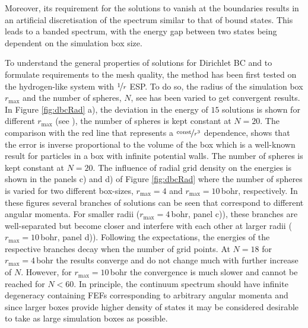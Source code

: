 Moreover, its requirement for the solutions to vanish at the boundaries results in an artificial discretisation of the spectrum similar to that of bound states.
This leads to a banded spectrum, with the energy gap between two states being dependent on the simulation box size.

To understand the general properties of solutions for Dirichlet BC and to formulate requirements to the mesh quality, the method has been first tested on the hydrogen-like system with $\nicefrac{1}{r}$ ESP.
To do so, the radius of the simulation box $r_\text{max}$ and the number of spheres, $N$, see  has been varied to get convergent results.
In Figure \ref{fig:dbcRad} a), the deviation in the energy of $15$ solutions is shown for different $r_\text{max}$ (see ), the number of spheres is kept constant at $N=20$.
The comparison with the red line that represents a $\nicefrac{\text{const}}{r^3}$ dependence, shows that the error is inverse proportional to the volume of the box which is a well-known result for particles in a box with infinite potential walls. 
The number of spheres is kept constant at $N=20$.
The influence of radial grid density on the energies is shown in the panels c) and d) of Figure \ref{fig:dbcRad} where the number of spheres is varied for two different box-sizes, $r_\text{max}=4$ and $r_\text{max}=10\,$bohr, respectively.
In these figures several branches of solutions can be seen that correspond to different angular momenta.
For smaller radii ($r_\text{max}=4\,$bohr, panel c)), these branches are well-separated but become closer and interfere with each other at larger radii ($r_\text{max}=10\,$bohr, panel d)).
Following the expectations, the energies of the respective branches decay when the number of grid points.
At $N=18$ for $r_\text{max}=4\,$bohr the results converge and do not change much with further increase of $N$.
However, for $r_\text{max}=10\,$bohr the convergence is much slower and cannot be reached for $N<60$.
In principle, the continuum spectrum should have infinite degeneracy containing FEFs corresponding to arbitrary angular momenta and since larger boxes provide higher density of states it may be considered desirable to take as large simulation boxes as possible.
